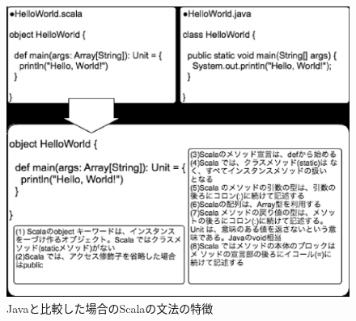 \documentclass[10pt]{jarticle}
\begin{document}
\begin{figure}[hb]
  \centering
  \caption{Javaと比較した場合のScalaの文法の特徴}
  \includegraphics[scale=1]{img/hello_world_code.eps}
\end{figure}
\end{document}
